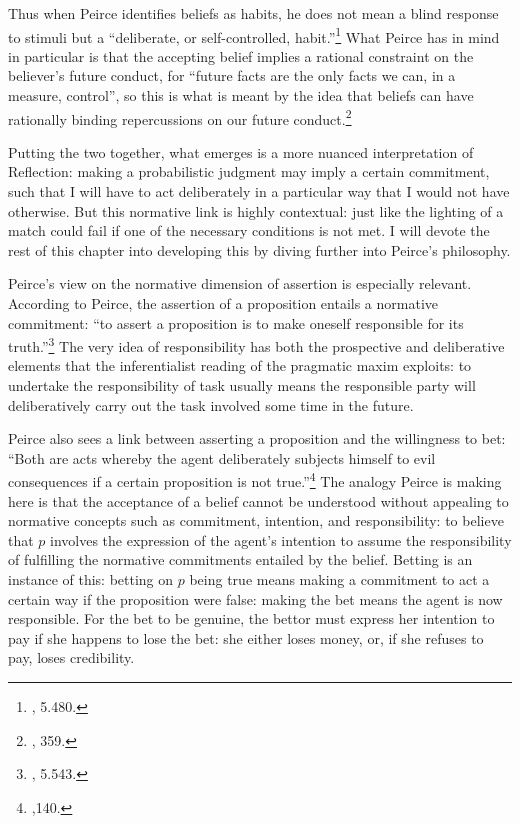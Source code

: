 Thus when Peirce identifies beliefs as habits, he does not mean a blind
response to stimuli but a ``deliberate, or self-controlled,
habit.''\footnote{\cite{CP}, 5.480.} What Peirce has in mind in particular is that
the accepting belief implies a rational constraint on the believer's
future conduct, for ``future facts are the only facts we can, in a
measure, control'', so this is what is meant by the idea that beliefs
can have rationally binding repercussions on our future
conduct.\footnote{\cite{essentialpeirce2},
  359.}

Putting the two together, what emerges is a more nuanced interpretation
of Reflection: making a probabilistic judgment may imply a certain
commitment, such that I will have to act deliberately in a particular
way that I would not have otherwise. But this normative link is highly
contextual: just like the lighting of a match could fail if one of the
necessary conditions is not met. I will devote the rest of this chapter
into developing this by diving further into Peirce's philosophy.

Peirce's view on the normative dimension of assertion is especially
relevant. According to Peirce, the assertion of a proposition entails a
normative commitment: ``to assert a proposition is to make oneself
responsible for its truth.''\footnote{\cite{CP}, 5.543.} The very idea of responsibility
has both the prospective and deliberative elements that the
inferentialist reading of the pragmatic maxim exploits: to undertake the
responsibility of task usually means the responsible party will
deliberatively carry out the task involved some time in the future.

Peirce also sees a link between asserting a proposition and the
willingness to bet: ``Both are acts whereby the agent deliberately
subjects himself to evil consequences if a certain proposition is not
true.''\footnote{\cite{essentialpeirce2},140.} The analogy Peirce is making here is that the acceptance of a
belief cannot be understood without appealing to normative concepts such
as commitment, intention, and responsibility: to believe that \(p\)
involves the expression of the agent's intention to assume the
responsibility of fulfilling the normative commitments entailed by the
belief. Betting is an instance of this: betting on \(p\) being true
means making a commitment to act a certain way if the proposition were
false: making the bet means the agent is now responsible. For the bet to
be genuine, the bettor must express her intention to pay if she happens
to lose the bet: she either loses money, or, if she refuses to pay,
loses credibility.

